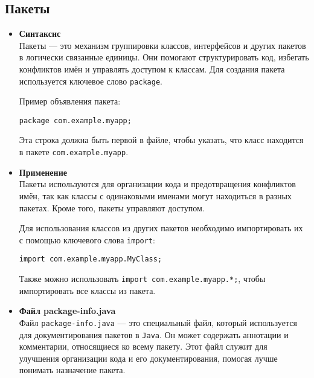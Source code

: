 \subsection{Пакеты}
\begin{itemize}
    \item \textbf{Синтаксис} \\
    Пакеты — это механизм группировки классов, интерфейсов и других пакетов в логически связанные единицы. Они помогают структурировать код, избегать конфликтов имён и управлять доступом к классам. Для создания пакета используется ключевое слово \texttt{package}.

    Пример объявления пакета:
    \begin{verbatim}
package com.example.myapp;
    \end{verbatim}
    Эта строка должна быть первой в файле, чтобы указать, что класс находится в пакете \texttt{com.example.myapp}.


    \item \textbf{Применение} \\
    Пакеты используются для организации кода и предотвращения конфликтов имён, так как классы с одинаковыми именами могут находиться в разных пакетах. Кроме того, пакеты управляют доступом.

    Для использования классов из других пакетов необходимо импортировать их с помощью ключевого слова \texttt{import}:
    \begin{verbatim}
import com.example.myapp.MyClass;
    \end{verbatim}
    Также можно использовать \texttt{import com.example.myapp.*;}, чтобы импортировать все классы из пакета.


    \item \textbf{Файл package-info.java} \\
    Файл \texttt{package-info.java} — это специальный файл, который используется для документирования пакетов в \texttt{Java}. Он может содержать аннотации и комментарии, относящиеся ко всему пакету. Этот файл служит для улучшения организации кода и его документирования, помогая лучше понимать назначение пакета.
\end{itemize}

